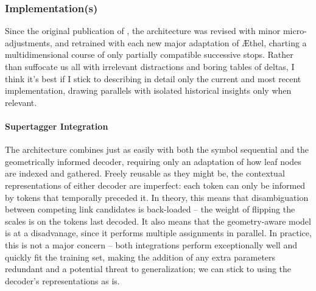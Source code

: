 \subsubsection{Implementation(s)}
Since the original publication of \citet{kogkalidis-etal-2020-neural}, the architecture was revised with minor micro-adjustments, and retrained with each new major adaptation of \AE thel, charting a multidimensional course of only partially compatible successive stops.
Rather than suffocate us all with irrelevant distractions and boring tables of deltas, I think it's best if I stick to describing in detail only the current and most recent implementation, drawing parallels with isolated historical insights only when relevant.

\paragraph{Supertagger Integration}
The architecture combines just as easily with both the symbol sequential and the geometrically informed decoder, requiring only an adaptation of how leaf nodes are indexed and gathered.
Freely reusable as they might be, the contextual representations of either decoder are imperfect: each token can only be informed by tokens that temporally preceded it.
In theory, this means that disambiguation between competing link candidates is back-loaded -- the weight of flipping the scales is on the tokens last decoded. 
It also means that the geometry-aware model is at a disadvanage, since it performs multiple assignments in parallel.
In practice, this is not a major concern -- both integrations perform exceptionally well and quickly fit the training set, making the addition of any extra parameters redundant and a potential threat to generalization; we can stick to using the decoder's representations as is.

